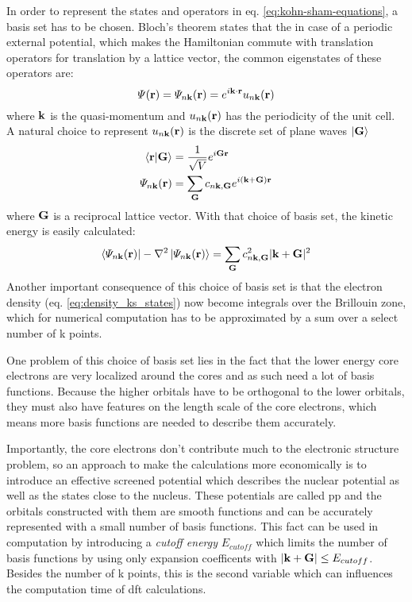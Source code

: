 \documentclass[main.tex]{subfiles}
\begin{document}
In order to represent the states and operators in eq. \ref{eq:kohn-sham-equations}, a basis set has to be chosen.
Bloch's theorem states that the in case of a periodic external potential, which makes the Hamiltonian commute with translation operators for translation by a lattice vector, the common eigenstates of these operators are:
\begin{equation}
    \Psi (\vb{r}) = \Psi_{n \vb{k}} (\vb{r}) = e^{i \vb{k} \cdot \vb{r}} u_{n \vb{k}} (\vb{r})
\end{equation}
where \(\vb{k}\) is the quasi-momentum and \(u_{n \vb{k}} (\vb{r})\) has the periodicity of the unit cell.
A natural choice to represent \(u_{n \vb{k}} (\vb{r})\) is the discrete set of plane waves \(\ket{\vb{G}}\)
\begin{align}
    \bra{\vb{r}} \ket{\vb{G}} &= \frac{1}{\sqrt{V}} e^{i \vb{G} \vb{r}} \\
    \Psi_{n \vb{k}} (\vb{r}) &= \sum_{\vb{G}} c_{n \vb{k}, \vb{G}} e^{i (\vb{k} + \vb{G}) \vb{r}}
\end{align}
where \(\vb{G}\) is a reciprocal lattice vector.
With that choice of basis set, the kinetic energy is easily calculated:
\begin{equation}
    \bra{\Psi_{n \vb{k}} (\vb{r})} - \nabla^2 \ket{\Psi_{n \vb{k}} (\vb{r})} = \sum_{\vb{G}} c_{n \vb{k}, \vb{G}}^2 \vert \vb{k} + \vb{G} \vert^2
\end{equation}
Another important consequence of this choice of basis set is that the electron density (eq. \ref{eq:density_ks_states}) now become integrals over the Brillouin zone, which for numerical computation has to be approximated by a sum over a select number of k points.

One problem of this choice of basis set lies in the fact that the lower energy core electrons are very localized around the cores and as such need a lot of basis functions.
Because the higher orbitals have to be orthogonal to the lower orbitals, they must also have features on the length scale of the core electrons, which means more basis functions are needed to describe them accurately.

Importantly, the core electrons don't contribute much to the electronic structure problem, so an approach to make the calculations more economically is to introduce an effective screened potential which describes the nuclear potential as well as the states close to the nucleus.
These potentials are called \acrfull{pp} and the orbitals constructed with them are smooth functions and can be accurately represented with a small number of basis functions.
This fact can be used in computation by introducing a \emph{cutoff energy} \(E_{cutoff}\) which limits the number of basis functions by using only expansion coefficents with \(\vert \vb{k} + \vb{G} \vert \leq E_{cutoff}\). Besides the number of k points, this is the second variable which can influences the computation time of \acrshort{dft} calculations.
\end{document}
